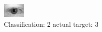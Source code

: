 \begin{figure}[h!]
\begin{center}
\includegraphics[width=0.60\columnwidth]{figures/ID595_class_2_target_3.png}
\end{center}
\caption{ Classification: 2 actual target: 3}
\label{fig:ID595_class_2_target_3}
\end{figure}
